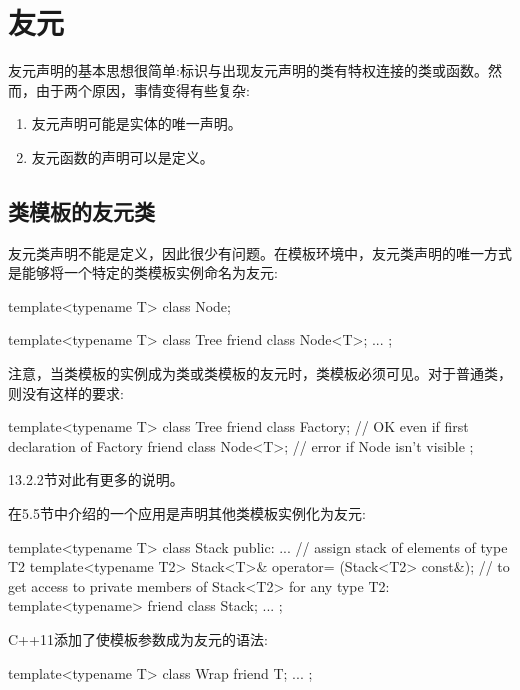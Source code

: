 \section{友元}

友元声明的基本思想很简单:标识与出现友元声明的类有特权连接的类或函数。然而，由于两个原因，事情变得有些复杂:

\begin{enumerate}
\item 
友元声明可能是实体的唯一声明。

\item 
友元函数的声明可以是定义。
\end{enumerate}

\subsection{类模板的友元类}

友元类声明不能是定义，因此很少有问题。在模板环境中，友元类声明的唯一方式是能够将一个特定的类模板实例命名为友元:

\begin{cpp}
template<typename T>
class Node;

template<typename T>
class Tree {
	friend class Node<T>;
	...
};
\end{cpp}

注意，当类模板的实例成为类或类模板的友元时，类模板必须可见。对于普通类，则没有这样的要求:

\begin{cpp}
template<typename T>
class Tree {
	friend class Factory; // OK even if first declaration of Factory
	friend class Node<T>; // error if Node isn’t visible
};
\end{cpp}

13.2.2节对此有更多的说明。

在5.5节中介绍的一个应用是声明其他类模板实例化为友元:

\begin{cpp}
template<typename T>
class Stack {
	public:
	...
	// assign stack of elements of type T2
	template<typename T2>
	Stack<T>& operator= (Stack<T2> const&);
	// to get access to private members of Stack<T2> for any type T2:
	template<typename> friend class Stack;
	...
};
\end{cpp}

C++11添加了使模板参数成为友元的语法:

\begin{cpp}
template<typename T>
class Wrap {
	friend T;
	...
};
\end{cpp}

